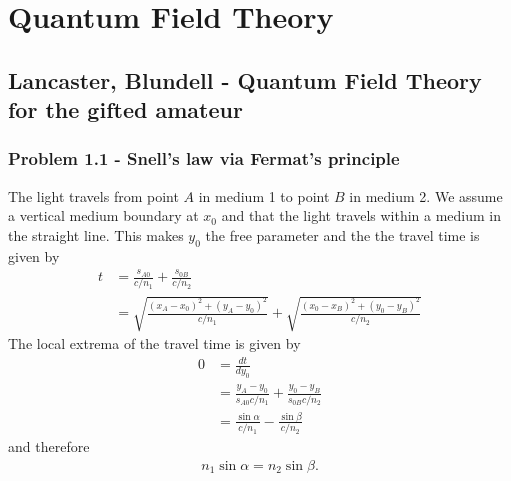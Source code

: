 \documentclass[10pt,a4paper]{book}
\theoremstyle{definition}
\begin{document}
\chapter{Quantum Field Theory}
\section{{\sc Lancaster, Blundell} - Quantum Field Theory for the gifted amateur}
\subsection{Problem 1.1 - Snell's law via Fermat's principle}
The light travels from point $A$ in medium 1 to point $B$ in medium 2. We assume a vertical medium boundary at $x_0$ and that the light travels within a medium in the straight line. This makes $y_0$ the free parameter and the the travel time is given by
\begin{align}
    t&=\frac{s_{A0}}{c/n_1}+\frac{s_{0B}}{c/n_2}\\
    &=\sqrt{\frac{(x_A-x_0)^2+(y_A-y_0)^2}{c/n_1}}+\sqrt{\frac{(x_0-x_B)^2+(y_0-y_B)^2}{c/n_2}}
\end{align}
The local extrema of the travel time is given by
\begin{align}
    0&=\frac{dt}{dy_0}\\
    &=\frac{y_A-y_0}{s_{A0}c/n_1}+\frac{y_0-y_B}{s_{0B}c/n_2}\\
    &=\frac{\sin\alpha}{c/n_1}-\frac{\sin\beta}{c/n_2}
\end{align}
and therefore
\begin{align}
n_1\sin\alpha=n_2\sin\beta.
\end{align}
\end{document}
